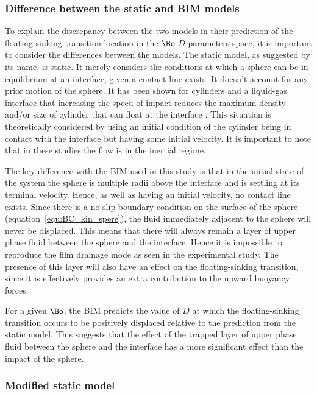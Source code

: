 {\subsubsection{Difference between the static and BIM models}
\label{subsubsec:model_diff}

To explain the discrepancy between the two models in their prediction of the floating-sinking transition location in the $\Bo$-$D$ parameters space, it is important to consider the differences between the models. The static model, as suggested by its name, is static. It merely considers the conditions at which a sphere can be in equilibrium at an interface, given a contact line exists. It doesn't account for any prior motion of the sphere. It has been shown for cylinders and a liquid-gas interface that increasing the speed of impact reduces the maximum density and/or size of cylinder that can float at the interface \citet{Vella07, Vella10}. This situation is theoretically considered by using an initial condition of the cylinder being in contact with the interface but having some initial velocity. It is important to note that in these studies the flow is in the inertial regime.

The key difference with the BIM used in this study is that in the initial state of the system the sphere is multiple radii above the interface and is settling at its terminal velocity. Hence, as well as having an initial velocity, no contact line exists. Since there is a no-slip boundary condition on the surface of the sphere (equation~\ref{equ:BC_kin_spere}), the fluid immediately adjacent to the sphere will never be displaced. This means that there will always remain a layer of upper phase fluid between the sphere and the interface. Hence it is impossible to reproduce the film drainage mode as seen in the experimental study. The presence of this layer will also have an effect on the floating-sinking transition, since it is effectively provides an extra contribution to the upward buoyancy forces. 

For a given $\Bo$, the BIM predicts the value of $D$ at which the floating-sinking transition occurs to be positively displaced relative to the prediction from the static model. This suggests that the effect of the trapped layer of upper phase fluid between the sphere and the interface has a more significant effect than the impact of the sphere.

\subsubsection{Modified static model}
\label{subsubsec:mod_stat_mod}

}
